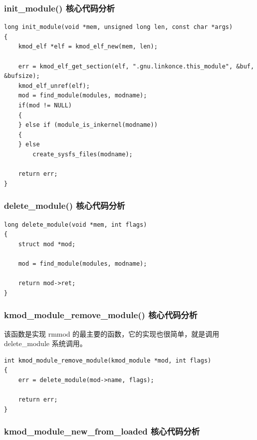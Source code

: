 \documentclass[11pt,a4paper]{article}
\begin{document}
\subsubsection{init\_module() 核心代码分析}

{\begin{shaded}\begin{verbatim}
long init_module(void *mem, unsigned long len, const char *args)
{
    kmod_elf *elf = kmod_elf_new(mem, len);

    err = kmod_elf_get_section(elf, ".gnu.linkonce.this_module", &buf, &bufsize);
    kmod_elf_unref(elf);
    mod = find_module(modules, modname);
    if(mod != NULL)
    { 
    } else if (module_is_inkernel(modname))
    {
    } else
        create_sysfs_files(modname);

    return err;
}
\end{verbatim}\end{shaded}}
\subsubsection{delete\_module() 核心代码分析}

{\begin{shaded}\begin{verbatim}
long delete_module(void *mem, int flags)
{
    struct mod *mod;

    mod = find_module(modules, modname);

    return mod->ret;
}
\end{verbatim}\end{shaded}}
\subsubsection{kmod\_module\_remove\_module() 核心代码分析}

该函数是实现 rmmod 的最主要的函数，它的实现也很简单，就是调用
delete\_module 系统调用。

{\begin{shaded}\begin{verbatim}
int kmod_module_remove_module(kmod_module *mod, int flags)
{
    err = delete_module(mod->name, flags);

    return err;
}
\end{verbatim}\end{shaded}}
\subsubsection{kmod\_module\_new\_from\_loaded 核心代码分析}
\end{document}
